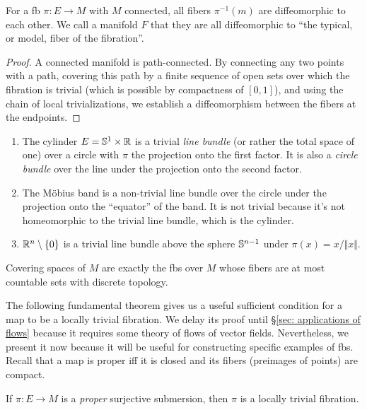 \begin{prop}
    For a \gls{fb} $\pi:E\to M$ with $M$ connected, all fibers $\pi^{-1}(m)$ are diffeomorphic to each other. We call a manifold $F$ that they are all diffeomorphic to ``the typical, or model, fiber of the fibration''.
\end{prop}
\begin{proof}
    A connected manifold is path-connected. By connecting any two points with a path, covering this path by a finite sequence of open sets over which the fibration is trivial (which is possible by compactness of $[0,1]$), and using the chain of local trivializations, we establish a diffeomorphism between the fibers at the endpoints.
\end{proof}
\begin{example}
\begin{enumerate}
    \item The cylinder $E=\mathbb{S}^1\times\mathbb{R} $ is a trivial \emph{line bundle} (or rather the total space of one) over a circle with $\pi$ the projection onto the first factor. It is also a \emph{circle bundle} over the line under the projection onto the second factor.
    \item The M\"obius band is a non-trivial line bundle over the circle under the projection onto the ``equator'' of the band. It is not trivial because it's not homeomorphic to the trivial line bundle, which is the cylinder.
    \item $\mathbb{R}^n\setminus\{0\}$ is a trivial line bundle above the sphere $\mathbb{S}^{n-1}$ under $\pi(x)=x/\Vert x\Vert$.
\end{enumerate}
\end{example}


\begin{example}
    Covering spaces of $M$ are exactly the \glspl{fb} over $M$ whose fibers are at most countable sets with discrete topology.
\end{example}

The following fundamental theorem gives us a useful sufficient condition for a map to be a locally trivial fibration. We delay its proof until \S\ref{sec: applications of flows} because it requires some theory of flows of vector fields. Nevertheless, we present it now because it will be useful for constructing specific examples of \glspl{fb}. Recall that a map is proper iff it is closed and its fibers (preimages of points) are compact.

\begin{thm}\label{thm Ehresmann}
    If $\pi:E\to M$ is a \emph{proper} surjective submersion, then $\pi$ is a locally trivial fibration.
\end{thm}

